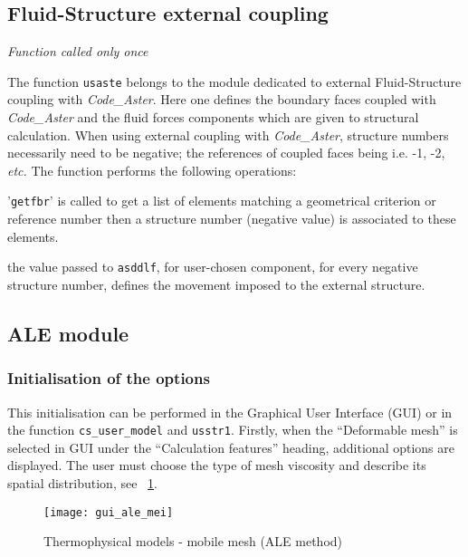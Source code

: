 \subsection{Fluid-Structure external coupling}

\noindent
\textit{Function called only once}

The function \texttt{usaste} belongs to the module dedicated to external
 Fluid-Structure coupling with \textit{Code\_Aster}. Here one defines the boundary
 faces coupled with \textit{Code\_Aster} and the fluid forces components which are
 given to structural calculation. When using external coupling with \textit{Code\_Aster},
 structure numbers necessarily need to be negative; the references of coupled faces being
 i.e. -1, -2, \emph{etc.}
The function performs the following operations:
\begin{list}{-}{}
 \item '\texttt{getfbr}' is called to get a list of elements matching a
geometrical criterion or reference number then a structure number (negative value) is associated
 to these elements.
 \item the value passed to \texttt{asddlf}, for user-chosen component, for every negative
 structure number, defines the movement imposed to the external structure.
\end{list}
%
\clearpage
%
\subsection{ALE module}
\subsubsection{Initialisation of the options}
This initialisation can be performed in the Graphical User Interface (GUI)
 or in the function \texttt{cs\_user\_model} and \texttt{usstr1}. Firstly,
 when the ``Deformable mesh'' is selected in GUI under the ``Calculation features''
 heading, additional options are displayed. The user must choose the type of mesh
 viscosity and describe its spatial distribution, see \figurename~\ref{fig:Ini-ale}.

\begin{figure}[!ht]
\begin{center}
\texttt{[image: gui\_ale\_mei]}
\caption{Thermophysical models - mobile mesh (ALE method)}
\label{fig:Ini-ale}
\end{center}
\end{figure}

